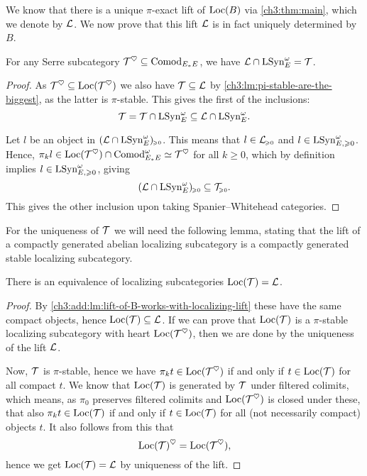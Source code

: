 We know that there is a unique $\pi$-exact lift of $\operatorname{Loc}(B)$ via \cref{ch3:thm:main}, which we denote by $\mathcal{L}$. We now prove that this lift $\mathcal{L}$ is in fact uniquely determined by $B$. 

\begin{lemma}
    \label{ch3:add:lm:lift-of-B-works-with-localizing-lift}
    For any Serre subcategory $\mathcal{T}^\heartsuit\subseteq \mathrm{Comod}_{E_*E}$, we have $\mathcal{L}\cap \mathrm{LSyn}_{E}^\omega = \mathcal{T}$. 
\end{lemma}
\begin{proof}
    As $\mathcal{T}^\heartsuit \subseteq \operatorname{Loc}(\mathcal{T}^\heartsuit)$ we also have $\mathcal{T} \subseteq \mathcal{L}$ by \cref{ch3:lm:pi-stable-are-the-biggest}, as the latter is $\pi$-stable. This gives the first of the inclusions:
    \[\mathcal{T} = \mathcal{T} \cap \mathrm{LSyn}_{E}^\omega\subseteq \mathcal{L} \cap \mathrm{LSyn}_{E}^\omega.\]
    
    Let $l$ be an object in $(\mathcal{L}\cap \mathrm{LSyn}_{E}^\omega)_{\hspace{-1pt}\scriptscriptstyle\geqslant 0}$. This means that $l\in \mathcal{L}_{\hspace{-1pt}\scriptscriptstyle\geqslant 0}$ and $l \in \mathrm{LSyn}_{E, \geqslant 0}^\omega$. Hence, $\pi_k l \in \operatorname{Loc}(\mathcal{T}^\heartsuit)\cap \mathrm{Comod}_{E_*E}^\omega \simeq \mathcal{T}^\heartsuit$ for all $k\geq 0$, which by definition implies $l \in \mathrm{LSyn}_{E, \geqslant 0}^\omega$, giving 
    \[(\mathcal{L}\cap \mathrm{LSyn}_{E}^\omega)_{\hspace{-1pt}\scriptscriptstyle\geqslant 0} \subseteq \mathcal{T}_{\hspace{-1pt}\scriptscriptstyle\geqslant 0}.\]
    This gives the other inclusion upon taking Spanier--Whitehead categories. 
\end{proof}


For the uniqueness of $\mathcal{T}$ we will need the following lemma, stating that the lift of a compactly generated abelian localizing subcategory is a compactly generated stable localizing subcategory. 

\begin{lemma}
    \label{ch3:add:lm:loc-of-lift-is-localizing-lift}
    There is an equivalence of localizing subcategories $\operatorname{Loc}(\mathcal{T}) = \mathcal{L}$. 
\end{lemma}
\begin{proof}
    By \cref{ch3:add:lm:lift-of-B-works-with-localizing-lift} these have the same compact objects, hence $\operatorname{Loc}(\mathcal{T})\subseteq \mathcal{L}$. If we can prove that $\operatorname{Loc}(\mathcal{T})$ is a $\pi$-stable localizing subcategory with heart $\operatorname{Loc}(\mathcal{T}^\heartsuit)$, then we are done by the uniqueness of the lift $\mathcal{L}$. 

    Now, $\mathcal{T}$ is $\pi$-stable, hence we have $\pi_k t \in \operatorname{Loc}(\mathcal{T}^\heartsuit)$ if and only if $t\in \operatorname{Loc}(\mathcal{T})$ for all compact $t$. We know that $\operatorname{Loc}(\mathcal{T})$ is generated by $\mathcal{T}$ under filtered colimits, which means, as $\pi_0$ preserves filtered colimits and $\operatorname{Loc}(\mathcal{T}^\heartsuit)$ is closed under these, that also $\pi_k t\in \operatorname{Loc}(\mathcal{T})$ if and only if $t\in \operatorname{Loc}(\mathcal{T})$ for all (not necessarily compact) objects $t$. It also follows from this that 
    \[\operatorname{Loc}(\mathcal{T})^\heartsuit = \operatorname{Loc}(\mathcal{T}^\heartsuit),\]
    hence we get $\operatorname{Loc}(\mathcal{T}) = \mathcal{L}$ by uniqueness of the lift. 
\end{proof}

